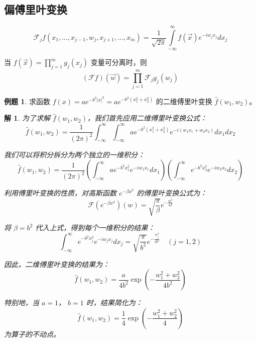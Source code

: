 \documentclass[12pt,a4paper]{article}
\numberwithin{subsection}{section}   %
\numberwithin{subsubsection}{subsection}
\theoremstyle{plain}
\newtheorem{solution}{解}[subsection]  %
\theoremstyle{definition}
\newtheorem{example}{例题}[subsection]  %
\theoremstyle{remark}
\theoremstyle{remark}
\begin{document}
\subsection{偏傅里叶变换}
\begin{equation}
	\mathcal{F}_j f(x_1, \dots, x_{j-1}, w_j, x_{j+1}, \dots, x_m) = \frac{1}{\sqrt{2\pi}} \int\limits_{-\infty}^{\infty} f(\vec{x}) e^{-i w_j x_j} dx_j
\end{equation}

当 $f(\vec{x}) = \prod_{j=1}^m g_j(x_j)$ 变量可分离时，则
\begin{equation}
	(\mathcal{F}f)(\vec{w}) = \prod_{j=1}^m \mathcal{F}_j g_j(w_j)
\end{equation}

\begin{example}
	求函数 \( f(x) = a e^{-b^2 |x|^2} = a e^{-b^2 (x_1^2 + x_2^2)} \) 的二维傅里叶变换 \( \hat{f}(w_1, w_2) \)。
\end{example}

\begin{solution}
	为了求解 \( \hat{f}(w_1, w_2) \)，我们首先应用二维傅里叶变换公式：
	\begin{equation}
		\hat{f}(w_1, w_2) = \frac{1}{(2\pi)^2} \int_{-\infty}^{\infty} \int_{-\infty}^{\infty} a e^{-b^2 (x_1^2 + x_2^2)} e^{-i(w_1 x_1 + w_2 x_2)} dx_1 dx_2
	\end{equation}
	
	我们可以将积分拆分为两个独立的一维积分：
	\begin{equation}
		\hat{f}(w_1, w_2) = \frac{1}{(2\pi)^2} \left( \int_{-\infty}^{\infty} a e^{-b^2 x_1^2} e^{-i w_1 x_1} dx_1 \right) \left( \int_{-\infty}^{\infty} e^{-b^2 x_2^2} e^{-i w_2 x_2} dx_2 \right)
	\end{equation}
	
	利用傅里叶变换的性质，对高斯函数 \( e^{-\beta x^2} \) 的傅里叶变换公式为：
	\begin{equation}
		\mathcal{F}(e^{-\beta x^2})(w) = \sqrt{\frac{\pi}{\beta}} e^{-\frac{w^2}{4\beta}}
	\end{equation}
	
	将 \( \beta = b^2 \) 代入上式，得到每个一维积分的结果：
	\begin{equation}
		\int_{-\infty}^{\infty} e^{-b^2 x_j^2} e^{-i w_j x_j} dx_j = \sqrt{\frac{\pi}{b^2}} e^{-\frac{w_j^2}{4 b^2}} \quad (j = 1, 2)
	\end{equation}
	
	因此，二维傅里叶变换的结果为：
	\begin{equation}
		\hat{f}(w_1, w_2) = \frac{a}{4 b^2} \exp\left(-\frac{w_1^2 + w_2^2}{4 b^2}\right)
	\end{equation}
	
	特别地，当 \( a = 1 \)， \( b = 1 \) 时，结果简化为：
	\begin{equation}
		\hat{f}(w_1, w_2) = \frac{1}{4} \exp\left(-\frac{w_1^2 + w_2^2}{4}\right)
	\end{equation}
	为算子的不动点。
\end{solution}
\end{document}
